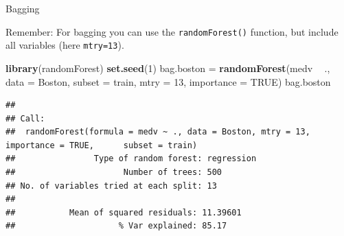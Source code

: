 \documentclass[10pt,ignorenonframetext,]{beamer}
\newenvironment{Shaded}{\begin{snugshade}}{\end{snugshade}}
\newcommand{\KeywordTok}[1]{\textcolor[rgb]{0.13,0.29,0.53}{\textbf{#1}}}
\newcommand{\DataTypeTok}[1]{\textcolor[rgb]{0.13,0.29,0.53}{#1}}
\newcommand{\DecValTok}[1]{\textcolor[rgb]{0.00,0.00,0.81}{#1}}
\newcommand{\StringTok}[1]{\textcolor[rgb]{0.31,0.60,0.02}{#1}}
\newcommand{\OtherTok}[1]{\textcolor[rgb]{0.56,0.35,0.01}{#1}}
\newcommand{\OperatorTok}[1]{\textcolor[rgb]{0.81,0.36,0.00}{\textbf{#1}}}
\newcommand{\NormalTok}[1]{#1}
\begin{document}
\begin{frame}[fragile]

\begin{block}{Bagging}

\vspace{2mm}

\small
Remember: For bagging you can use the \texttt{randomForest()} function,
but include all variables (here \texttt{mtry=13}).

\scriptsize

\begin{Shaded}
\begin{Highlighting}[]
\KeywordTok{library}\NormalTok{(randomForest)}
\KeywordTok{set.seed}\NormalTok{(}\DecValTok{1}\NormalTok{)}
\NormalTok{bag.boston =}\StringTok{ }\KeywordTok{randomForest}\NormalTok{(medv }\OperatorTok{~}\StringTok{ }\NormalTok{., }\DataTypeTok{data =}\NormalTok{ Boston, }\DataTypeTok{subset =}\NormalTok{ train, }\DataTypeTok{mtry =} \DecValTok{13}\NormalTok{, }
    \DataTypeTok{importance =} \OtherTok{TRUE}\NormalTok{)}
\NormalTok{bag.boston}
\end{Highlighting}
\end{Shaded}

\begin{verbatim}
## 
## Call:
##  randomForest(formula = medv ~ ., data = Boston, mtry = 13, importance = TRUE,      subset = train) 
##                Type of random forest: regression
##                      Number of trees: 500
## No. of variables tried at each split: 13
## 
##           Mean of squared residuals: 11.39601
##                     % Var explained: 85.17
\end{verbatim}

\end{block}

\end{frame}
\end{document}
